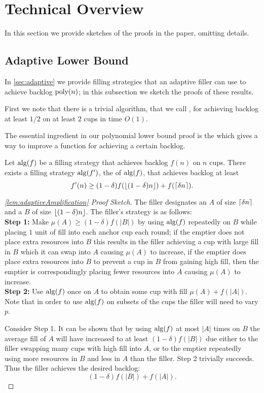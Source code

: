 \section{Technical Overview}
\label{sec:technical_overview}

In this section we provide sketches of the proofs in the paper,
omitting details.

\subsection{Adaptive Lower Bound}
In \cref{sec:adaptive} we provide filling strategies that an
adaptive filler can use to achieve backlog $\operatorname{\text{poly}}(n)$; in this
subsection we sketch the proofs of these results.

First we note that there is a trivial algorithm, that we call
, for achieving backlog at least $1/2$ on at
least $2$ cups in time $O(1)$.

The essential ingredient in our polynomial lower bound proof is
the  which gives a way to improve a
function for achieving a certain backlog.
\begin{lemma}
  Let $\operatorname{\text{\textup{alg}}}(f)$ be a filling strategy that achieves backlog
  $f(n)$ on $n$ cups. There exists a filling strategy $\operatorname{\text{\textup{alg}}}(f')$,
  the  of $\operatorname{\text{\textup{alg}}}(f)$, that achieves backlog at
  least $$f'(n) \ge (1-\delta) f(\left\lfloor (1-\delta)n \right\rfloor) +
  f(\left\lceil \delta n \right\rceil).$$
\end{lemma}
\begin{proof}[\cref{lem:adaptiveAmplification} Proof Sketch]
The filler designates an  $A$ of size
$\left\lceil \delta n \right\rceil$ and a  $B$ of size
$\left\lfloor (1-\delta)n \right\rfloor$. The filler's strategy is as follows:\\
\textbf{Step 1:} 
Make $\mu(A) \ge (1-\delta) f(|B|)$ by using $\operatorname{\text{\textup{alg}}}(f)$ repeatedly
on $B$ while placing $1$ unit of fill into each anchor cup each
round; if the emptier does not place extra resources into $B$
this results in the filler achieving a cup with large fill in $B$
which it can swap into $A$ causing $\mu(A)$ to increase, if the
emptier does place extra resources into $B$ to prevent a cup in
$B$ from gaining high fill, then the emptier is correspondingly
placing fewer resources into $A$ causing $\mu(A)$ to increase.\\
\textbf{Step 2:} Use $\operatorname{\text{\textup{alg}}}(f)$ once on $A$ to obtain some cup
with fill $\mu(A)+f(|A|)$.\\
Note that in order to use $\operatorname{\text{\textup{alg}}}(f)$ on subsets of the cups the
filler will need to vary $p$.

Consider Step 1. It can be shown that by using $\operatorname{\text{\textup{alg}}}(f)$ at most
$|A|$ times on $B$ the average fill of $A$ will have increased to
at least $(1-\delta)f(|B|)$ due either to the filler swapping
many cups with high fill into $A$, or to the emptier repeatedly
using more resources in $B$ and less in $A$ than the filler.
Step 2 trivially succeeds. Thus the filler achieves the desired
backlog:
$$(1-\delta) f(|B|) + f(|A|).$$
  
\end{proof}

